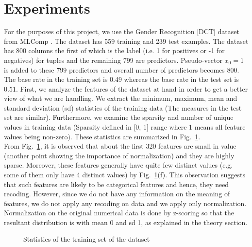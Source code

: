 \documentclass[a4paper]{article}
\begin{document}
\section{Experiments}

For the purposes of this project, we use the Gender Recognition [DCT] dataset from MLComp \cite{Label1}. The dataset has 559 training and 239 test examples. The dataset has 800 columns the first of which is the label (i.e. 1 for positives or -1 for negatives) for tuples and the remaining 799 are predictors. Pseudo-vector $x_0 = 1$ is added to these 799 predictors and overall number of predictors becomes 800. The base rate in the training set is 0.49 whereas the base rate in the test set is 0.51. First, we analyze the features of the dataset at hand in order to get a better view of what we are handling. We extract the minimum, maximum, mean and standard deviation (sd) statistics of the training data (The measures in the test set are similar). Furthermore, we examine the sparsity and number of unique values in training data (Sparsity defined in [0, 1] range where 1 means all feature values being non-zero). These statistics are summarized in Fig.~\ref{fig:stats}.\\

From Fig.~\ref{fig:stats}, it is observed that about the first 320 features are small in value (another point showing the importance of normalization) and they are highly sparse. Moreover, these features generally have quite few distinct values (e.g. some of them only have 4 distinct values) by Fig.~\ref{fig:stats}(f). This observation suggests that such features are likely to be categorical features and hence, they need recoding. However, since we do not have any information on the meaning of features, we do not apply any recoding on data and we apply only normalization. Normalization on the original numerical data is done by z-scoring so that the resultant distribution is with mean 0 and sd 1, as explained in the theory section. \\

\begin{figure}
  \caption{Statistics of the training set of the dataset}
  \label{fig:stats}
\end{figure}
\end{document}
